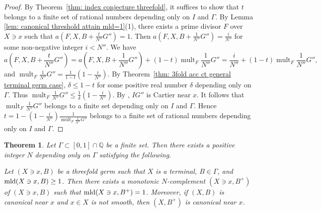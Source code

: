 \documentclass[11pt]{amsart}
\numberwithin{equation}{section}
\newcommand{\Qq}{\mathbb{Q}}
\newcommand{\mld}{{\rm{mld}}}
\newcommand{\mult}{\operatorname{mult}}
\newcommand{\Ii}{{\Gamma}}
\newtheorem{thm}{Theorem}[section]
\theoremstyle{definition}
\theoremstyle{definition}
\begin{document}
\begin{proof}
By Theorem~\ref{thm: index conjecture threefold}, it suffices to show that $t$ belongs to a finite set of rational numbers depending only on  $I$ and $\Ii$. By Lemma \ref{lem: canonical threshold attain mld=1}(1), there exists a prime divisor $F$ over $X\ni x$ such that $a(F,X,B+\frac{t}{N''}G'')=1$. Then $a(F,X,B+\frac{1}{N''}G'')=\frac{i}{N''}$ for some non-negative integer $i<N''$. We have $$a(F,X,B+\frac{t}{N''}G'')=a(F,X,B+\frac{1}{N''}G'')+(1-t)\mult_F \frac{1}{N''}G''=\frac{i}{N''}+(1-t)\mult_F \frac{1}{N''}G'',$$ and $\mult_F \frac{1}{N''}G''=\frac{1}{1-t}(1-\frac{i}{N''})$. By Theorem~\ref{thm: 3fold acc ct general terminal germ case}, $\delta\le 1-t$ for some positive real number $\delta$ depending only on $\Ii$. Thus $\mult_F \frac{1}{N''}G''\leq \frac{1}{\delta}(1-\frac{i}{N''})$. By \cite[Lemma~5.1]{Kaw88}, $IG''$ is Cartier near $x$. It follows that $\mult_F \frac{1}{N''}G''$ belongs to a finite set depending only on $I$ and $\Ii$. Hence $t=1-(1-\frac{i}{N''})\frac{1}{\mult_F \frac{1}{N''}G''}$ belongs to a finite set of rational numbers depending only on $I$ and $\Ii$.
\end{proof}


\begin{thm}\label{thm: N-complements for canonical pair finite rational coeff}
Let $\Gamma\subset [0,1]\cap \Qq$ be a finite set. Then there exists a positive integer $N$ depending only on $\Ii$ satisfying the following.

Let $(X\ni x,B)$ be a threefold germ such that $X$ is a terminal, $B\in \Ii$, and $\mld(X\ni x, B)\geq 1$. Then there exists a monotonic $N$-complement $(X\ni x, B^+)$ of $(X\ni x, B)$ such that $\mld(X\ni x, B^+)=1$. Moreover, if $(X ,B)$ is canonical near $x$ and $x\in X$ is not smooth, then $(X, B^+)$ is canonical near $x$.
\end{thm}
\end{document}
